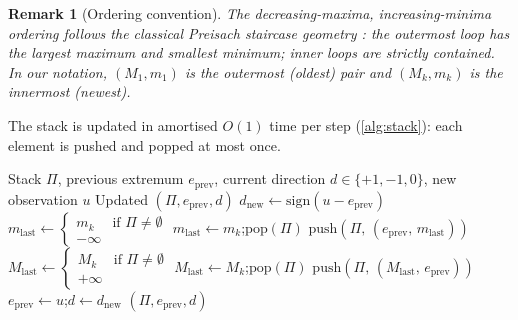 \documentclass[preprint,12pt]{elsarticle}
\newtheorem{remark}[theorem]{Remark}
\newcommand{\stack}{\Pi}
\begin{document}
\begin{remark}[Ordering convention]
The decreasing-maxima, increasing-minima ordering follows the
classical Preisach staircase geometry \citep{Mayergoyz1991}:
the outermost loop has the largest maximum and smallest minimum;
inner loops are strictly contained.
In our notation, $(M_1,m_1)$ is the outermost (oldest) pair and
$(M_k,m_k)$ is the innermost (newest).
\end{remark}

The stack is updated in amortised $O(1)$ time per step
(\cref{alg:stack}): each element is pushed and popped at most once.

\begin{algorithm}[t]
\caption{Extremum Stack Update (wiping-out rule)}
\label{alg:stack}
\small
\begin{algorithmic}[1]
\Require Stack $\stack$, previous extremum $e_{\mathrm{prev}}$,
         current direction $d \in \{+1,-1,0\}$,
         new observation $u$
\Ensure Updated $(\stack, e_{\mathrm{prev}}, d)$
\State $d_{\mathrm{new}} \leftarrow \mathrm{sign}(u - e_{\mathrm{prev}})$
  \State \Return {}
\EndIf
{}
   
    \State $m_{\mathrm{last}} \leftarrow
      \begin{cases} m_k & \text{if } \stack \neq \emptyset \\ -\infty \end{cases}$
    \While{$\stack \neq \emptyset$ \textbf{and} $M_k < e_{\mathrm{prev}}$}
      \State $m_{\mathrm{last}} \leftarrow m_k$;\quad $\mathrm{pop}(\stack)$
    \EndWhile
    \State $\mathrm{push}(\stack,\,(e_{\mathrm{prev}},\,m_{\mathrm{last}}))$
  \Else {}
    \State $M_{\mathrm{last}} \leftarrow
      \begin{cases} M_k & \text{if } \stack \neq \emptyset \\ +\infty \end{cases}$
    \While{$\stack \neq \emptyset$ \textbf{and} $m_k > e_{\mathrm{prev}}$}
      \State $M_{\mathrm{last}} \leftarrow M_k$;\quad $\mathrm{pop}(\stack)$
    \EndWhile
    \State $\mathrm{push}(\stack,\,(M_{\mathrm{last}},\,e_{\mathrm{prev}}))$
  \EndIf
\EndIf
\State $e_{\mathrm{prev}} \leftarrow u$;\quad $d \leftarrow d_{\mathrm{new}}$
\State \Return $(\stack, e_{\mathrm{prev}}, d)$
\end{algorithmic}
\end{algorithm}
\end{document}
